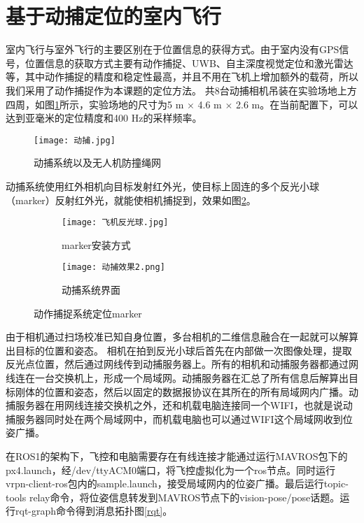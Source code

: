   \section{基于动捕定位的室内飞行}
室内飞行与室外飞行的主要区别在于位置信息的获得方式。由于室内没有GPS信号，位置信息的获取方式主要有动作捕捉、UWB、自主深度视觉定位和激光雷达等，其中动作捕捉的精度和稳定性最高，并且不用在飞机上增加额外的载荷，所以我们采用了动作捕捉作为本课题的定位方法。
共8台动捕相机吊装在实验场地上方四周，如图\ref{动捕}所示，实验场地的尺寸为5 m $\times$ 4.6 m $\times$ 2.6 m。在当前配置下，可以达到亚毫米的定位精度和400 Hz的采样频率\cite{qingtong}。
\begin{figure}[!h]
  \centering
  \texttt{[image: 动捕.jpg]}
  \caption{动捕系统以及无人机防撞绳网}
  \label{动捕}
\end{figure}
动捕系统使用红外相机向目标发射红外光，使目标上固连的多个反光小球（marker）反射红外光，就能使相机捕捉到，效果如图\ref{反光小球}。


\begin{figure}[h]
  \centering
  \begin{subfigure}[c]{0.4\textwidth}
    \centering
    \texttt{[image: 飞机反光球.jpg]}
    \caption{marker安装方式}
  \end{subfigure}\hfill
    \begin{subfigure}[c]{0.55\textwidth}
      \centering
      \texttt{[image: 动捕效果2.png]}
      \caption{动捕系统界面}
  \end{subfigure}
  \caption{动作捕捉系统定位marker}
  \label{反光小球}
  \end{figure}


由于相机通过扫场校准已知自身位置，多台相机的二维信息融合在一起就可以解算出目标的位置和姿态。
相机在拍到反光小球后首先在内部做一次图像处理，提取反光点位置，然后通过网线传到动捕服务器上。所有的相机和动捕服务器都通过网线连在一台交换机上，形成一个局域网。动捕服务器在汇总了所有信息后解算出目标刚体的位置和姿态，然后以固定的数据报协议在其所在的所有局域网内广播。动捕服务器在用网线连接交换机之外，还和机载电脑连接同一个WIFI，也就是说动捕服务器同时处在两个局域网中，而机载电脑也可以通过WIFI这个局域网收到位姿广播。

在ROS1的架构下，飞控和电脑需要存在有线连接才能通过运行MAVROS包下的px4.launch，经/dev/ttyACM0端口，将飞控虚拟化为一个ros节点。同时运行vrpn-client-ros包内的sample.launch，接受局域网内的位姿广播。最后运行topic-tools relay命令，将位姿信息转发到MAVROS节点下的vision-pose/pose话题。运行rqt-graph命令得到消息拓扑图\ref{rqt}。

